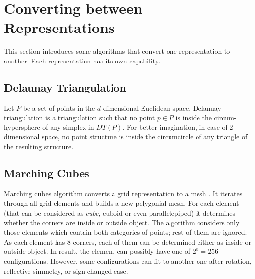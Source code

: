 \section{Converting between Representations}

This section introduces some algorithms that convert one representation to another. Each 
representation has its own capability.

\subsection{Delaunay Triangulation}

Let $P$ be a set of points in the $d$-dimensional Euclidean space.
Delanuay triangulation\cite{Chew1989} is a triangulation such that
no point $p \in P$ is inside the circum-hypersphere
of any simplex in $DT(P)$. For better imagination, in case of $2$-dimensional space, no point
structure is inside the circumcircle of any triangle of the resulting structure.

\subsection{Marching Cubes}
\label{sub:march}

Marching cubes algorithm converts a grid representation to a mesh \cite{Lorensen1987}. It iterates through
all grid elements and builds a new polygonial mesh. For each element (that can be considered as
\emph{cube}, cuboid or even parallelepiped)
it determines whether the corners are inside or outside object. The algorithm considers only those elements
which contain both categories of points; rest of them are ignored. As each element has 8 corners,
each of them can be determined either as inside or outside object. In result, the element can possibly
have one of $2^8 = 256$ configurations. However, some configurations can fit to another one after rotation,
reflective simmetry, or sign changed case.\\


